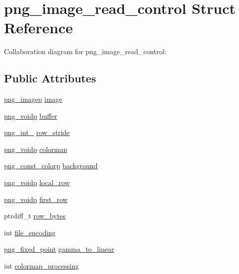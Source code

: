 \hypertarget{structpng__image__read__control}{}\section{png\+\_\+image\+\_\+read\+\_\+control Struct Reference}
\label{structpng__image__read__control}


Collaboration diagram for png\+\_\+image\+\_\+read\+\_\+control\+:
\subsection*{Public Attributes}
\begin{DoxyCompactItemize}
\item 
\hyperlink{png_8h_a849cd575ed0f106df40172e07d04c0f8}{png\+\_\+imagep} \hyperlink{structpng__image__read__control_a303c182f2fd25572d886b405c50ded36}{image}
\item 
\hyperlink{pngconf_8h_a9dc088c359b6d7e45682af63a3361b58}{png\+\_\+voidp} \hyperlink{structpng__image__read__control_a352cfd88a2209d6280999fead1df6916}{buffer}
\item 
\hyperlink{pngrutil_8c_a1f5cf5f6a913e237d8a9a7c0a6ea1714}{png\+\_\+int\+\_} \hyperlink{structpng__image__read__control_a208248176819e1320a7f4ea4c6594ba0}{row\+\_\+stride}
\item 
\hyperlink{pngconf_8h_a9dc088c359b6d7e45682af63a3361b58}{png\+\_\+voidp} \hyperlink{structpng__image__read__control_a81331646b05cbcf4dd75f3b337126dc7}{colormap}
\item 
\hyperlink{png_8h_afb823b4ea392204bf0766ecea182d6d7}{png\+\_\+const\+\_\+colorp} \hyperlink{structpng__image__read__control_a0bd8cdd6b864ab8c1f40519c19ba26dc}{background}
\item 
\hyperlink{pngconf_8h_a9dc088c359b6d7e45682af63a3361b58}{png\+\_\+voidp} \hyperlink{structpng__image__read__control_a6eeb91a1255a2baae9a1f3981285939e}{local\+\_\+row}
\item 
\hyperlink{pngconf_8h_a9dc088c359b6d7e45682af63a3361b58}{png\+\_\+voidp} \hyperlink{structpng__image__read__control_a433feb427eae36d3d70e2eda98adec52}{first\+\_\+row}
\item 
ptrdiff\+\_\+t \hyperlink{structpng__image__read__control_ac788a77c56f6b93e57041361dbfc2bb9}{row\+\_\+bytes}
\item 
int \hyperlink{structpng__image__read__control_a77931c72de5517eccfb756f9e27f3f43}{file\+\_\+encoding}
\item 
\hyperlink{pngconf_8h_a23911f489715bb4644c9c9c808cbab5a}{png\+\_\+fixed\+\_\+point} \hyperlink{structpng__image__read__control_aad78903e3776439e708c68a94233a5f6}{gamma\+\_\+to\+\_\+linear}
\item 
int \hyperlink{structpng__image__read__control_a76295e2526582e612e8cd898cbb7f840}{colormap\+\_\+processing}
\end{DoxyCompactItemize}


